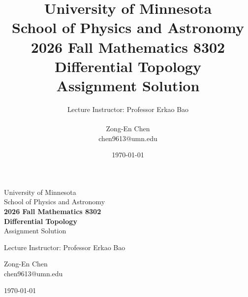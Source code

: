 \documentclass[12pt,letterpaper]{article}
\title{University of Minnesota\\
School of Physics and Astronomy\\
\textbf{2026 Fall Mathematics 8302\\Differential Topology}\\ 
Assignment Solution}
\author{Lecture Instructor: Professor Erkao Bao \\ \\
        Zong-En Chen\\ chen9613@umn.edu}
\date{\today}
\begin{document}
\onehalfspacing
\begin{titlepage}
    \centering
    \vspace*{\fill} %
    {\LARGE University of Minnesota\\
    School of Physics and Astronomy\\[1em]
    \textbf{2026 Fall Mathematics 8302\\Differential Topology}\\ 
    Assignment Solution \par}
    \vspace{2cm}
    {\large Lecture Instructor: Professor Erkao Bao \par}
    \vspace{1cm}
    {\large Zong-En Chen\\ chen9613@umn.edu \par}
    \vspace{2cm}
    {\large \today \par}
    \vspace*{\fill} %
\end{titlepage}




%
\end{document}
